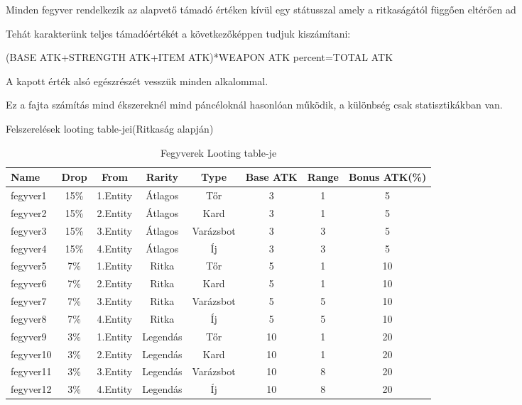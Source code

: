 Minden fegyver rendelkezik az alapvető támadó értéken kívül egy státusszal amely a ritkaságától függően eltérően ad %

Tehát karakterünk teljes támadóértékét a következőképpen tudjuk kiszámítani:

(BASE ATK+STRENGTH ATK+ITEM ATK)*WEAPON ATK percent=TOTAL ATK

A kapott érték alsó egészrészét vesszük minden alkalommal.

Ez a fajta számítás mind ékszereknél mind páncéloknál hasonlóan működik, a különbség csak statisztikákban van.

Felszerelések looting table-jei(Ritkaság alapján)
\begin{table}[!ht]
\centering
\caption{Fegyverek Looting table-je}
\label{tab:table3}
\tabcolsep=0.11cm
\begin{tabular}{|l|c|c|c|c|c|c|c|}
\hline
 Name & Drop & From & Rarity & Type & Base ATK & Range & Bonus ATK(\%) \\
\hline
 fegyver1 & 15\% & 1.Entity & Átlagos & Tőr & 3 & 1 & 5 \\
\hline
 fegyver2 & 15\% & 2.Entity & Átlagos & Kard & 3 & 1 & 5 \\
\hline
 fegyver3 & 15\% & 3.Entity & Átlagos & Varázsbot & 3 & 3 & 5\\
\hline
 fegyver4 & 15\% & 4.Entity & Átlagos  & Íj & 3 & 3 & 5\\
\hline
 fegyver5 & 7\% & 1.Entity & Ritka & Tőr & 5 & 1 & 10 \\
\hline
 fegyver6 & 7\% & 2.Entity & Ritka & Kard & 5 & 1 & 10 \\
\hline
 fegyver7 & 7\% & 3.Entity & Ritka & Varázsbot & 5 & 5 & 10\\
\hline
 fegyver8 & 7\% & 4.Entity & Ritka  & Íj & 5 & 5 & 10\\
\hline
 fegyver9 & 3\% & 1.Entity & Legendás & Tőr & 10 & 1 & 20 \\
\hline
 fegyver10 & 3\% & 2.Entity & Legendás & Kard & 10 & 1 & 20 \\
\hline
 fegyver11 & 3\% & 3.Entity & Legendás & Varázsbot & 10 & 8 & 20\\
\hline
 fegyver12 & 3\% & 4.Entity & Legendás  & Íj & 10 & 8 & 20\\
\hline
\end{tabular}
\end{table}
\tabcolsep=0.11cm
